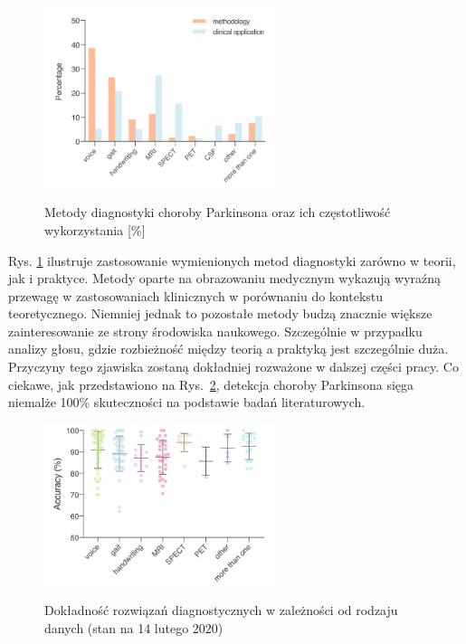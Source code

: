\begin{figure}[htbp]
	\centering\includegraphics[width=0.6\textwidth]{./img/plot_PD_detection_methods}~\caption{Metody diagnostyki choroby Parkinsona oraz ich częstotliwość wykorzystania [\%]~\cite {ML_for_PD_review}}
    \label{fig:pd_detection_methods}
\end{figure}


Rys. \ref{fig:pd_detection_methods} ilustruje zastosowanie wymienionych metod diagnostyki zarówno w teorii, jak i praktyce.
Metody oparte na obrazowaniu medycznym wykazują wyraźną przewagę w zastosowaniach klinicznych w porównaniu do kontekstu teoretycznego.
Niemniej jednak to pozostałe metody budzą znacznie większe zainteresowanie ze strony środowiska naukowego.
Szczególnie w przypadku analizy głosu, gdzie rozbieżność między teorią a praktyką jest szczególnie duża.
Przyczyny tego zjawiska zostaną dokładniej rozważone w dalszej części pracy.
Co ciekawe, jak przedstawiono na Rys.~\ref{fig:pd_accuracy_methods}, detekcja choroby Parkinsona sięga niemalże 100\% skuteczności na podstawie badań literaturowych.

\begin{figure}[htbp]
	\centering
	\includegraphics[width=0.6\textwidth]{./img/accuracy}~\caption{Dokładność rozwiązań diagnostycznych w zależności od rodzaju danych (stan na 14 lutego 2020) \cite {ML_for_PD_review} }
    \label{fig:pd_accuracy_methods}
\end{figure}

